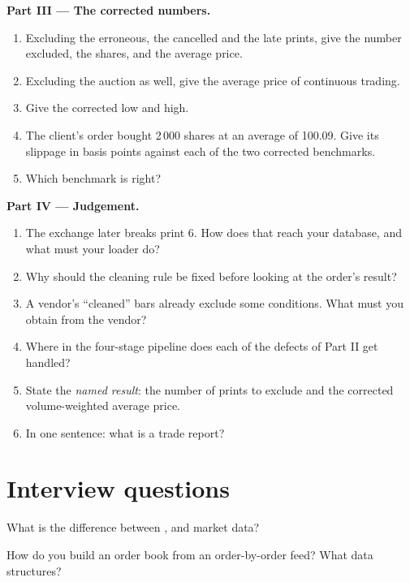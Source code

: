 \begin{problem}
\medskip\noindent\textbf{Part III --- The corrected numbers.}
\begin{enumerate}[resume]
\item Excluding the erroneous, the cancelled and the late prints, give the
number excluded, the shares, and the average price.
\item Excluding the auction as well, give the average price of continuous
trading.
\item Give the corrected low and high.
\item The client's order bought 2\,000 shares at an average of 100.09. Give
its slippage in basis points against each of the two corrected benchmarks.
\item Which benchmark is right?
\end{enumerate}

\medskip\noindent\textbf{Part IV --- Judgement.}
\begin{enumerate}[resume]
\item The exchange later breaks print 6. How does that reach your database,
and what must your loader do?
\item Why should the cleaning rule be fixed before looking at the order's
result?
\item A vendor's ``cleaned'' bars already exclude some conditions. What must
you obtain from the vendor?
\item Where in the four-stage pipeline does each of the defects of Part II
get handled?
\item State the \emph{named result}: the number of prints to exclude and the
corrected volume-weighted average price.
\item In one sentence: what is a trade report?
\end{enumerate}
\end{problem}

\section{Interview questions}

\begin{interviewq}\label{iq:m1:reading-market-data:1}
What is the difference between ,  and  market data?
\end{interviewq}

\begin{interviewq}\label{iq:m1:reading-market-data:2}
How do you build an order book from an order-by-order feed? What data
structures?
\end{interviewq}

